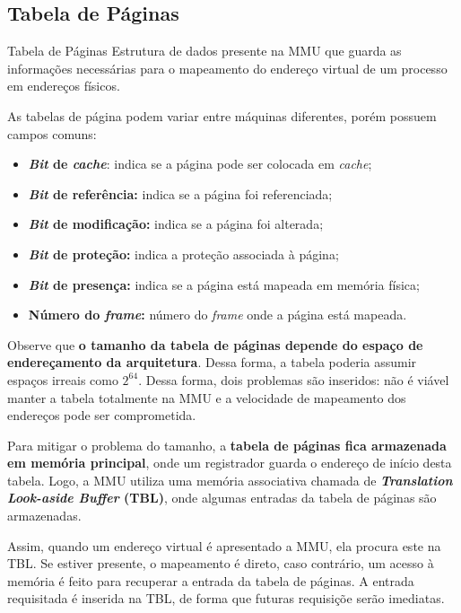 \subsection{Tabela de Páginas}
\begin{definicao}{Tabela de Páginas}
  Estrutura de dados presente na MMU que guarda as informações necessárias para o mapeamento do endereço virtual de um processo em endereços físicos.
\end{definicao}

As tabelas de página podem variar entre máquinas diferentes, porém possuem campos comuns:
\begin{itemize}
  \item \textbf{\textit{Bit} de \textit{cache}}: indica se a página pode ser colocada em \textit{cache};

  \item \textbf{\textit{Bit} de referência:} indica se a página foi referenciada;

  \item \textbf{\textit{Bit} de modificação:} indica se a página foi alterada;

  \item \textbf{\textit{Bit} de proteção:} indica a proteção associada à página;

  \item \textbf{\textit{Bit} de presença:} indica se a página está mapeada em memória física;

  \item \textbf{Número do \textit{frame}:} número do \textit{frame} onde a página está mapeada.
\end{itemize}

Observe que \textbf{o tamanho da tabela de páginas depende do espaço de endereçamento da arquitetura}. Dessa forma, a tabela poderia assumir espaços irreais como $2^64$. Dessa forma, dois problemas são inseridos: não é viável manter a tabela totalmente na MMU e a velocidade de mapeamento dos endereços pode ser comprometida.

Para mitigar o problema do tamanho, a \textbf{tabela de páginas fica armazenada em memória principal}, onde um registrador guarda o endereço de início desta tabela. Logo, a MMU utiliza uma memória associativa chamada de \textbf{\textit{Translation Look-aside Buffer} (TBL)}, onde algumas entradas da tabela de páginas são armazenadas.

Assim, quando um endereço virtual é apresentado a MMU, ela procura este na TBL. Se estiver presente, o mapeamento é direto, caso contrário, um acesso à memória é feito para recuperar a entrada da tabela de páginas. A entrada requisitada é inserida na TBL, de forma que futuras requisiçõe serão imediatas.

